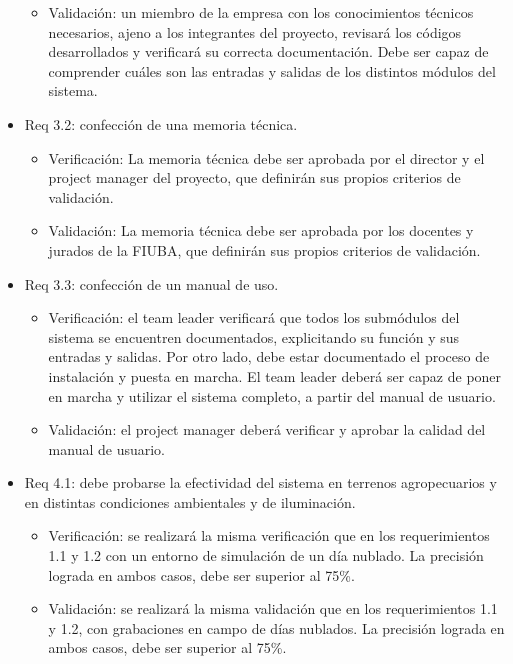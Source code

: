 \documentclass[
11pt, %
]{charter}
\begin{document}
\begin{itemize}
\begin{itemize}
		\item Validación: un miembro de la empresa con los conocimientos técnicos necesarios, ajeno a los integrantes del proyecto, revisará los códigos desarrollados y verificará su correcta documentación. Debe ser capaz de comprender cuáles son las entradas y salidas de los distintos módulos del sistema.
	\end{itemize}
	\item Req 3.2: confección de una memoria técnica.
	\begin{itemize}
		\item Verificación: La memoria técnica debe ser aprobada por el director y el project manager del proyecto, que definirán sus propios criterios de validación. 
		\item Validación: La memoria técnica debe ser aprobada por los docentes y jurados de la FIUBA, que definirán sus propios criterios de validación.
	\end{itemize}
	\item Req 3.3: confección de un manual de uso.
	\begin{itemize}
		\item Verificación: el team leader verificará que todos los submódulos del sistema se encuentren documentados, explicitando su función y sus entradas y salidas. Por otro lado, debe estar documentado el proceso de instalación y puesta en marcha. El team leader deberá ser capaz de poner en marcha y utilizar el sistema completo, a partir del manual de usuario.
		\item Validación: el project manager deberá verificar y aprobar la calidad del manual de usuario.
	\end{itemize}
	\item Req 4.1: debe probarse la efectividad del sistema en terrenos agropecuarios y en distintas condiciones ambientales y de iluminación.
	\begin{itemize}
		\item Verificación: se realizará la misma verificación que en los requerimientos 1.1 y 1.2 con un entorno de simulación de un día nublado. La precisión lograda en ambos casos, debe ser superior al 75\%. 
		\item Validación: se realizará la misma validación que en los requerimientos 1.1 y 1.2, con grabaciones en campo de días nublados. La precisión lograda en ambos casos, debe ser superior al 75\%.
	\end{itemize}
\end{itemize} 
\end{document}
